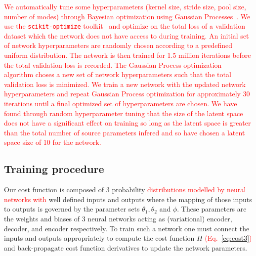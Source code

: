 \documentclass[%
showpacs,
nofootinbib,
 amsmath,amssymb,
 aps,
 twocolumn,
 prl,
 reprint,
floatfix,
]{revtex4-1}
\newcommand{\new}[1]{\textcolor{red}{#1}}
\begin{document}
%
%
\new{We automatically tune some hyperparameters (kernel size, stride size, 
pool size, number of modes) through Bayesian optimization 
using Gaussian Processes~\cite{Siria2020.06.11.144253,scikit-learn}. We use the 
\texttt{scikit-optimize} toolkit~\cite{scikit-learn} and 
optimize on the total loss of a validation dataset which the network does not 
have access to during training. An initial set of network hyperparameters are randomly chosen 
according to a predefined uniform distribution. The network is then trained for 1.5 
million iterations before the total validation loss is recorded. 
The Gaussian Process optimization algorithm choses a new set of network hyperparameters 
such that the total validation loss is minimized. We train a new network with the 
updated network hyperparameters and repeat Gaussian Process optimization for 
approximately 30 iterations until a final optimized set of hyperparameters are chosen. 
We have found through random hyperparameter tuning that the size of the latent space 
does not have a significant effect on training so long as the latent space 
is greater than the total number of source parameters infered and so have chosen a 
latent space size of 10 for the network.}

\subsection{Training procedure}
%
%
Our cost function is composed of 3 probability \new{distributions modelled by
neural networks with} well defined inputs and outputs where the mapping of
those inputs to outputs is governed by the parameter sets
$\theta_{1},\theta_{2}$ and $\phi$. These parameters are the weights and biases
of 3 neural networks acting as (variational) encoder, decoder, and encoder
respectively. To train such a network one must connect the inputs and outputs
appropriately to compute the cost function $H$ \new{(Eq.~\ref{eq:cost3})} and
back-propagate cost function derivatives to update the network parameters. 
\end{document}
